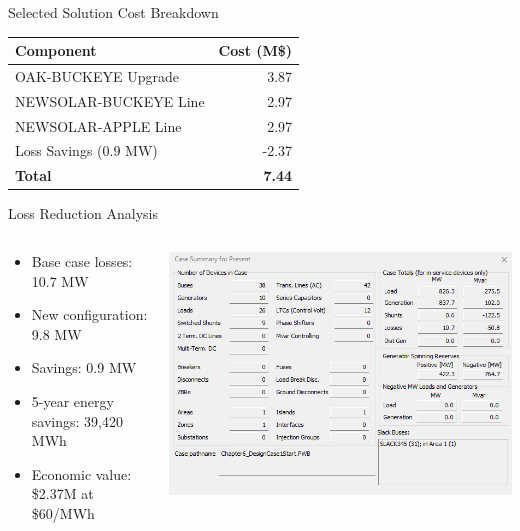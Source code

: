 \documentclass{beamer}
\begin{document}
	\begin{frame}{Selected Solution Cost Breakdown}
		\begin{table}
			\centering
			\begin{tabular}{|l|r|}
				\hline
				\textbf{Component} & \textbf{Cost (M\$)} \\
				\hline
				OAK-BUCKEYE Upgrade & 3.87 \\
				NEWSOLAR-BUCKEYE Line & 2.97 \\
				NEWSOLAR-APPLE Line & 2.97 \\
				Loss Savings (0.9 MW) & -2.37 \\
				\hline
				\textbf{Total} & \textbf{7.44} \\
				\hline
			\end{tabular}
		\end{table}
	\end{frame}
	
	\begin{frame}{Loss Reduction Analysis}
		\begin{columns}[T]
			\begin{column}{0.4\textwidth}
				\begin{itemize}
					\item Base case losses: 10.7 MW
					\item New configuration: 9.8 MW
					\item Savings: 0.9 MW
					\item 5-year energy savings: 39,420 MWh
					\item Economic value: \$2.37M at \$60/MWh
				\end{itemize}
			\end{column}
			\begin{column}{0.6\textwidth}
				\includegraphics[width=1\linewidth]{figures/case_summary_existing}
			\end{column}
		\end{columns}
	\end{frame}
	
\end{document}

